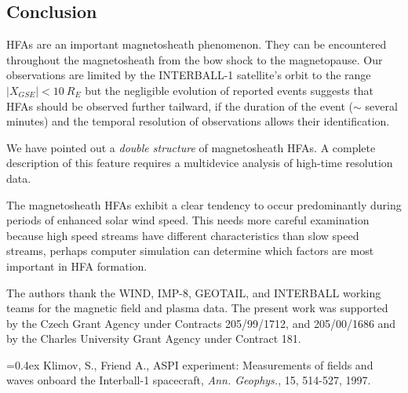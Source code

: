 \documentclass{article}
\begin{document}
\begin{article}
\section{Conclusion}
HFAs are an important magnetosheath phenomenon.
They can be encountered throughout the
magnetosheath from the bow shock to the magnetopause. Our
observations are limited by the INTERBALL-1 satellite's orbit to the
range $|X_{GSE}| < 10\> R_E$ but the negligible evolution of reported
events suggests that HFAs should be observed further tailward, if the
duration of the event ($\sim$ several minutes) and the temporal
resolution of observations allows their identification.

We have pointed out a {\it double structure} of magnetosheath
HFAs. A complete description of this feature requires a
multidevice analysis of high-time resolution data.

The magnetosheath HFAs exhibit a clear tendency to occur
predominantly during periods of enhanced solar wind speed.
This needs more careful examination because high speed streams
have different characteristics than slow speed streams,
perhaps computer simulation can determine which factors are
most important in HFA formation.

\acknowledgments %
{The authors thank the WIND, IMP-8, GEOTAIL, and INTERBALL working
teams for the
magnetic field and plasma data. The  present  work  was  supported by
the Czech  Grant  Agency  under  Contracts  205/99/1712, and
205/00/1686 and by the Charles University Grant Agency under
Contract 181.}



\begin{thebibliography}{}

\itemsep=0.4ex
{}
Klimov, S., Friend A., ASPI experiment: Measurements of fields and
waves onboard the Interball-1 spacecraft, {\it Ann. Geophys.}, 15,
514-527, 1997.


\end{thebibliography}
\end{article}
\end{document}
